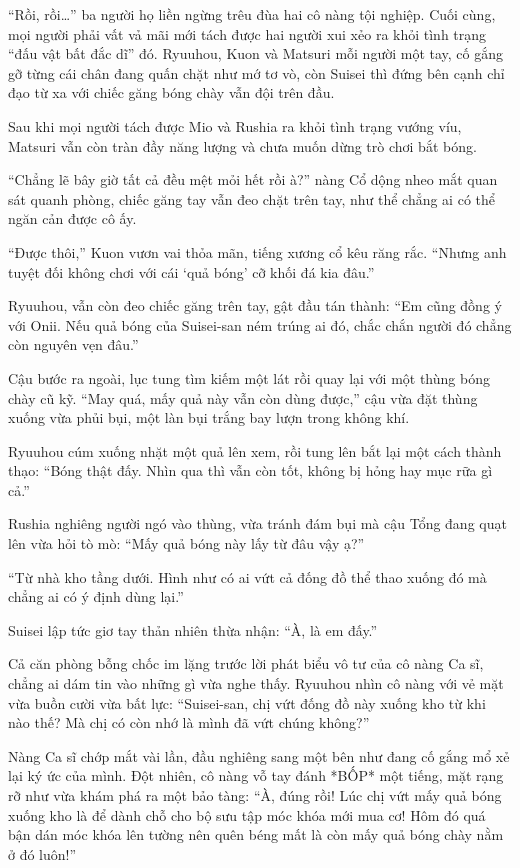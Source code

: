 \documentclass[../main.tex]{subfiles}
\begin{document}
``Rồi, rồi\dots'' ba người họ liền ngừng trêu đùa hai cô nàng tội nghiệp. Cuối cùng, mọi người phải vất vả mãi mới tách được hai người xui xẻo ra khỏi tình trạng ``đấu vật bất đắc dĩ'' đó. Ryuuhou, Kuon và Matsuri mỗi người một tay, cố gắng gỡ từng cái chân đang quấn chặt như mớ tơ vò, còn Suisei thì đứng bên cạnh chỉ đạo từ xa với chiếc găng bóng chày vẫn đội trên đầu.

\omk

Sau khi mọi người tách được Mio và Rushia ra khỏi tình trạng vướng víu, Matsuri vẫn còn tràn đầy năng lượng và chưa muốn dừng trò chơi bắt bóng.

``Chẳng lẽ bây giờ tất cả đều mệt mỏi hết rồi à?'' nàng Cổ dộng nheo mắt quan sát quanh phòng, chiếc găng tay vẫn đeo chặt trên tay, như thể chẳng ai có thể ngăn cản được cô ấy.

``Được thôi,'' Kuon vươn vai thỏa mãn, tiếng xương cổ kêu răng rắc. ``Nhưng anh tuyệt đối không chơi với cái `quả bóng' cỡ khối đá kia đâu.''

Ryuuhou, vẫn còn đeo chiếc găng trên tay, gật đầu tán thành: ``Em cũng đồng ý với Onii. Nếu quả bóng của Suisei-san ném trúng ai đó, chắc chắn người đó chẳng còn nguyên vẹn đâu.''

Cậu bước ra ngoài, lục tung tìm kiếm một lát rồi quay lại với một thùng bóng chày cũ kỹ. ``May quá, mấy quả này vẫn còn dùng được,'' cậu vừa đặt thùng xuống vừa phủi bụi, một làn bụi trắng bay lượn trong không khí.

Ryuuhou cúm xuống nhặt một quả lên xem, rồi tung lên bắt lại một cách thành thạo: ``Bóng thật đấy. Nhìn qua thì vẫn còn tốt, không bị hỏng hay mục rữa gì cả.''

Rushia nghiêng người ngó vào thùng, vừa tránh đám bụi mà cậu Tổng đang quạt lên vừa hỏi tò mò: ``Mấy quả bóng này lấy từ đâu vậy ạ?''

``Từ nhà kho tầng dưới. Hình như có ai vứt cả đống đồ thể thao xuống đó mà chẳng ai có ý định dùng lại.''

Suisei lập tức giơ tay thản nhiên thừa nhận: ``À, là em đấy.''

Cả căn phòng bỗng chốc im lặng trước lời phát biểu vô tư của cô nàng Ca sĩ, chẳng ai dám tin vào những gì vừa nghe thấy. Ryuuhou nhìn cô nàng với vẻ mặt vừa buồn cười vừa bất lực: ``Suisei-san, chị vứt đống đồ này xuống kho từ khi nào thế? Mà chị có còn nhớ là mình đã vứt chúng không?''

Nàng Ca sĩ chớp mắt vài lần, đầu nghiêng sang một bên như đang cố gắng mổ xẻ lại ký ức của mình. Đột nhiên, cô nàng vỗ tay đánh *BỐP* một tiếng, mặt rạng rỡ như vừa khám phá ra một bảo tàng: ``À, đúng rồi! Lúc chị vứt mấy quả bóng xuống kho là để dành chỗ cho bộ sưu tập móc khóa mới mua cơ! Hôm đó quá bận dán móc khóa lên tường nên quên béng mất là còn mấy quả bóng chày nằm ở đó luôn!''
\end{document}
